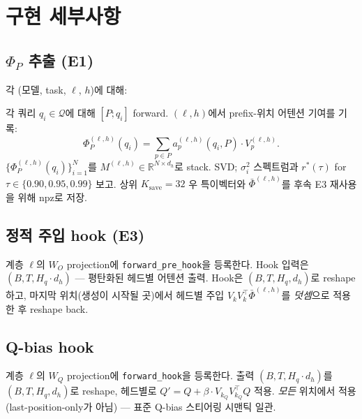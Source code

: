 \documentclass{article}
\theoremstyle{definition}
\newcommand{\R}{\mathbb{R}}
\newcommand{\bphi}{\bar{\Phi}}
\newcommand{\Phip}{\Phi_P}
\newcommand{\dh}{d_h}
\newcommand{\Hq}{H_q}
\begin{document}
\section{구현 세부사항}
\label{app:impl}

\subsection{$\Phip$ 추출 (E1)}
각 (모델, task, $\ell$, $h$)에 대해:
\begin{algorithmic}
\State 각 쿼리 $q_i \in \mathcal{Q}$에 대해 $[P; q_i]$ forward.
\State $(\ell, h)$에서 prefix-위치 어텐션 기여를 기록:
\[\Phip^{(\ell,h)}(q_i) = \sum_{p\in P} a_p^{(\ell,h)}(q_i, P)\cdot V_p^{(\ell,h)}.\]
\State $\{\Phip^{(\ell,h)}(q_i)\}_{i=1}^N$를 $M^{(\ell,h)}\in\R^{N\times \dh}$로 stack.
\State SVD; $\sigma_i^2$ 스펙트럼과 $r^*(\tau)$ for $\tau \in \{0.90, 0.95, 0.99\}$ 보고.
\State 상위 $K_{\mathrm{save}}{=}32$ 우 특이벡터와 $\bphi^{(\ell,h)}$를 후속 E3 재사용을 위해 npz로 저장.
\end{algorithmic}

\subsection{정적 주입 hook (E3)}
계층 $\ell$의 $W_O$ projection에 \texttt{forward\_pre\_hook}을 등록한다. Hook 입력은 $(B, T, \Hq\cdot \dh)$ --- 평탄화된 헤드별 어텐션 출력. Hook은 $(B, T, \Hq, \dh)$로 reshape하고, 마지막 위치(생성이 시작될 곳)에서 헤드별 주입 $V_k V_k^\top \bphi^{(\ell,h)}$를 \emph{덧셈}으로 적용한 후 reshape back.

\subsection{Q-bias hook}
계층 $\ell$의 $W_Q$ projection에 \texttt{forward\_hook}을 등록한다. 출력 $(B, T, \Hq\cdot \dh)$를 $(B, T, \Hq, \dh)$로 reshape, 헤드별로 $Q' = Q + \beta\cdot V_{k_Q} V_{k_Q}^\top Q$ 적용. \emph{모든} 위치에서 적용 (last-position-only가 아님) --- 표준 Q-bias 스티어링 시맨틱 일관.
\end{document}
